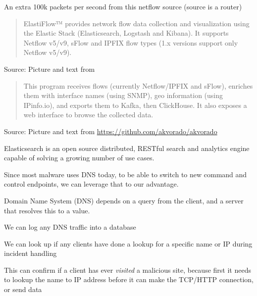 \documentclass[Screen16to9,17pt]{foils}
\begin{document}





\centerline{An extra 100k packets per second from this netflow source (source is a router)}





\begin{quote}
  ElastiFlow™ provides network flow data collection and visualization using the Elastic Stack (Elasticsearch, Logstash and Kibana). It supports Netflow v5/v9, sFlow and IPFIX flow types (1.x versions support only Netflow v5/v9).
\end{quote}
Source: Picture and text from  \\



\begin{quote}
This program receives flows (currently Netflow/IPFIX and sFlow), enriches them with interface names (using SNMP), geo information (using IPinfo.io), and exports them to Kafka, then ClickHouse. It also exposes a web interface to browse the collected data.
\end{quote}
Source: Picture and text from \url{https://github.com/akvorado/akvorado}




Elasticsearch is an open source distributed, RESTful search and analytics engine capable of solving a growing number of use cases.



Since most malware uses DNS today, to be able to switch to new command and control endpoints, we can leverage that to our advantage.

Domain Name System (DNS) depends on a query from the client, and a server that resolves this to a value.

\begin{list2}
\item We can log any DNS traffic into a database
\item We can look up if any clients have done a lookup for a specific name or IP during incident handling
\item This can confirm if a client has ever \emph{visited} a malicious site, because first it needs to lookup the name to IP address before it can make the TCP/HTTP connection, or send data
\end{list2}
\end{document}
